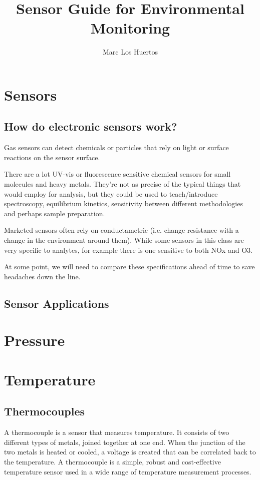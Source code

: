 \documentclass{article}\usepackage[]{graphicx}\usepackage[]{color}
\author{Marc Los Huertos}
\title{Sensor Guide for Environmental Monitoring}
\begin{document}
\maketitle
\tableofcontents

\newpage
\section{Sensors}

\subsection{How do electronic sensors work?}

Gas sensors can detect chemicals or particles that rely on light or surface reactions on the sensor surface. 

There are a lot UV-vis or fluorescence sensitive chemical sensors for small molecules and heavy metals. They're not as precise of the typical things that would employ for analysis, but they could be used to teach/introduce  spectroscopy, equilibrium kinetics,  sensitivity between different methodologies and perhaps sample preparation.  

Marketed sensors often rely on conductametric (i.e. change resistance with a change in the environment around them). While some sensors in this class are very specific to analytes, for example there is one  sensitive to both NOx and O3. 

At some point, we will need to compare these specifications ahead of time to save headaches down the line.

\subsection{Sensor Applications}

\section{Pressure}

\section{Temperature}

\subsection{Thermocouples}

A thermocouple is a sensor that measures temperature. It consists of two different types of metals, joined together at one end. When the junction of the two metals is heated or cooled, a voltage is created that can be correlated back to the temperature. A thermocouple is a simple, robust and cost-effective temperature sensor used in a wide range of temperature measurement processes.
\end{document}
